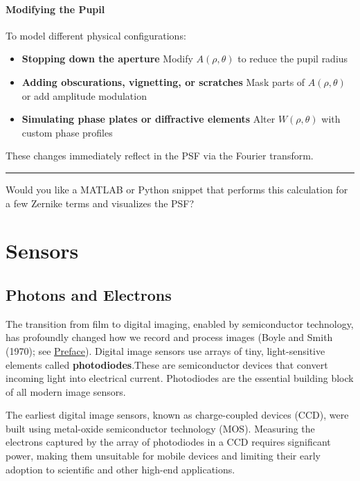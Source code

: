 \documentclass[
  letterpaper,
]{book}
\providecommand{\tightlist}{%
  \setlength{\itemsep}{0pt}\setlength{\parskip}{0pt}}\usepackage{longtable,booktabs,array}
\begin{document}
\subsection{Modifying the Pupil}\label{modifying-the-pupil}

To model different physical configurations:

\begin{itemize}
\tightlist
\item
  \textbf{Stopping down the aperture} Modify \(A(\rho, \theta)\) to
  reduce the pupil radius
\item
  \textbf{Adding obscurations, vignetting, or scratches} Mask parts of
  \(A(\rho, \theta)\) or add amplitude modulation
\item
  \textbf{Simulating phase plates or diffractive elements} Alter
  \(W(\rho, \theta)\) with custom phase profiles
\end{itemize}

These changes immediately reflect in the PSF via the Fourier transform.

\begin{center}\rule{0.5\linewidth}{0.5pt}\end{center}

Would you like a MATLAB or Python snippet that performs this calculation
for a few Zernike terms and visualizes the PSF?

\part{Sensors}

\chapter{Photons and Electrons}\label{sec-sensors-photons-electrons}

The transition from film to digital imaging, enabled by semiconductor
technology, has profoundly changed how we record and process images
(Boyle and Smith (1970); see \hyperref[sec-preface]{Preface}). Digital
image sensors use arrays of tiny, light-sensitive elements called
\textbf{photodiodes}.These are semiconductor devices that convert
incoming light into electrical current. Photodiodes are the essential
building block of all modern image sensors.

The earliest digital image sensors, known as charge-coupled devices
(CCD), were built using metal-oxide semiconductor technology (MOS).
Measuring the electrons captured by the array of photodiodes in a CCD
requires significant power, making them unsuitable for mobile devices
and limiting their early adoption to scientific and other high-end
applications.
\end{document}
